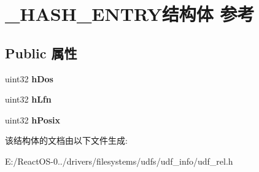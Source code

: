 \hypertarget{struct___h_a_s_h___e_n_t_r_y}{}\section{\+\_\+\+H\+A\+S\+H\+\_\+\+E\+N\+T\+R\+Y结构体 参考}
\label{struct___h_a_s_h___e_n_t_r_y}
\subsection*{Public 属性}
\begin{DoxyCompactItemize}
\item 
\mbox{\label{struct___h_a_s_h___e_n_t_r_y_adc0f0c630580c913a3d4dc343fffa2de}} 
uint32 {\bfseries h\+Dos}
\item 
\mbox{\label{struct___h_a_s_h___e_n_t_r_y_a69b8a238222f3129db7e60c12a2cac7e}} 
uint32 {\bfseries h\+Lfn}
\item 
\mbox{\label{struct___h_a_s_h___e_n_t_r_y_af902f12e8399970bf8c467e2fd21da1e}} 
uint32 {\bfseries h\+Posix}
\end{DoxyCompactItemize}


该结构体的文档由以下文件生成\+:\begin{DoxyCompactItemize}
\item 
E\+:/\+React\+O\+S-\/0../drivers/filesystems/udfs/udf\+\_\+info/udf\+\_\+rel.\+h\end{DoxyCompactItemize}
